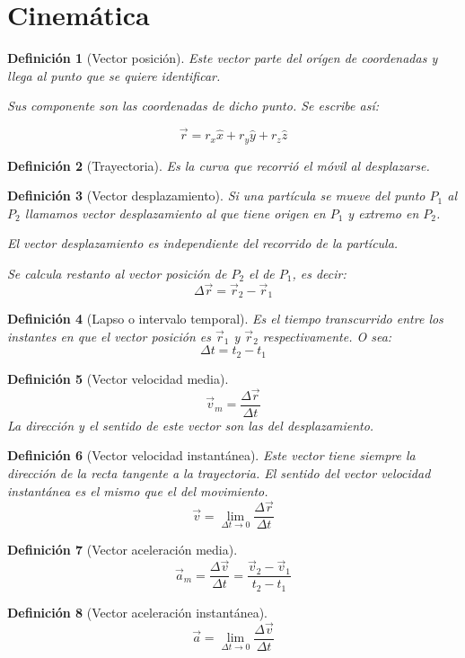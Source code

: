 \documentclass[12pt,a4paper]{article}
\newtheorem{mydef}{Definici\'on}[section]
\begin{document}
\section{Cinem\'atica}

\begin{mydef}[Vector posici\'on]
Este vector parte del or\'igen de coordenadas y llega al punto que
se quiere identificar.

Sus componente son las coordenadas de dicho punto. Se escribe as\'i:

\[ \vec{r}= r_x \hat{x} + r_y \hat{y} + r_z \hat{z} \]

\end{mydef}
\begin{mydef}[Trayectoria]
Es la curva que recorri\'o el m\'ovil al desplazarse.
\end{mydef}

\begin{mydef}[Vector desplazamiento]
Si una part\'icula se mueve del punto \(P_1\) al \(P_2\) llamamos
\emph{vector desplazamiento} al que tiene origen en \(P_1\) y extremo
en \(P_2\).

El vector desplazamiento es independiente del recorrido de la
part\'icula.

Se calcula restanto al vector posici\'on de \(P_2\) el de \(P_1\), es
decir:
\[ \Delta \vec{r} = \vec{r}_2 - \vec{r}_1 \]
\end{mydef}
\begin{mydef}[Lapso o intervalo temporal]
Es el tiempo transcurrido  entre los instantes en que el vector
posici\'on es \(\vec{r}_1\) y  \( \vec{r}_2\) respectivamente. O sea:
\[\Delta t = t_2 - t_1\]
\end{mydef}
\begin{mydef}[Vector velocidad media]
\[ \vec{v}_m = \frac{\Delta \vec{r}}{\Delta t } \]
La direcci\'on y el sentido de este vector son las del desplazamiento.
\end{mydef}
\begin{mydef}[Vector velocidad instant\'anea]
Este vector tiene siempre la direcci\'on de la recta tangente a la
trayectoria.
El sentido del vector velocidad instant\'anea es el mismo que el del
movimiento.
\[ \vec{v} = \lim_{\Delta t \to 0} \frac{\Delta \vec{r}}{\Delta t} \]
\end{mydef}
\begin{mydef}[Vector aceleraci\'on media]
\[ \vec{a}_m =  \frac{\Delta \vec{v}}{\Delta t} = \frac{\vec{v}_2 -
  \vec{v}_1}{t_2 - t_1} \]
\end{mydef}
\begin{mydef}[Vector aceleraci\'on instant\'anea]
\[ \vec{a} = \lim_{\Delta t \to 0} \frac{\Delta \vec{v}}{\Delta t} 
 \]
\end{mydef}
\end{document}
